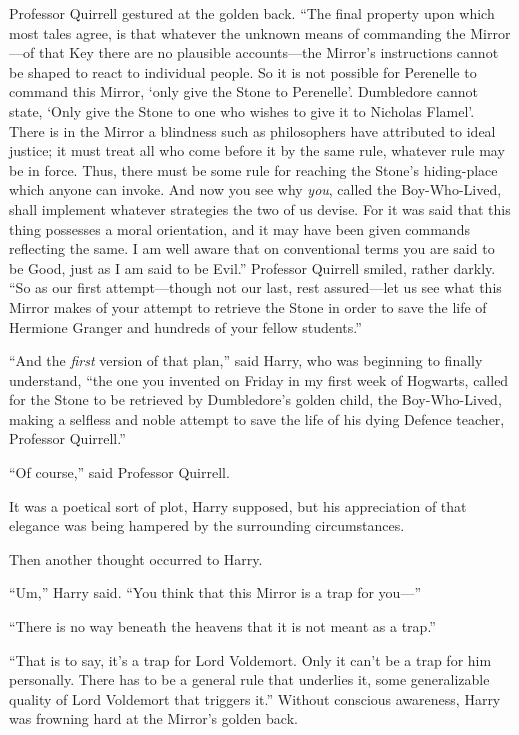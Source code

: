 Professor Quirrell gestured at the golden back. “The final property upon which
most tales agree, is that whatever the unknown means of commanding the
Mirror—of that Key there are no plausible accounts—the Mirror’s
instructions cannot be shaped to react to individual people. So it is not
possible for Perenelle to command this Mirror, ‘only give the Stone to
Perenelle’. Dumbledore cannot state, ‘Only give the Stone to one who wishes to
give it to Nicholas Flamel’. There is in the Mirror a blindness such as
philosophers have attributed to ideal justice; it must treat all who come
before it by the same rule, whatever rule may be in force. Thus, there must be
some rule for reaching the Stone’s hiding-place which anyone can invoke. And
now you see why \emph{you}, called the Boy-Who-Lived, shall implement whatever
strategies the two of us devise. For it was said that this thing possesses a
moral orientation, and it may have been given commands reflecting the same. I
am well aware that on conventional terms you are said to be Good, just as I am
said to be Evil.” Professor Quirrell smiled, rather darkly. “So as our first
attempt—though not our last, rest assured—let us see what this Mirror makes
of your attempt to retrieve the Stone in order to save the life of Hermione
Granger and hundreds of your fellow students.”

“And the \emph{first} version of that plan,” said Harry, who was beginning to
finally understand, “the one you invented on Friday in my first week of
Hogwarts, called for the Stone to be retrieved by Dumbledore’s golden child,
the Boy-Who-Lived, making a selfless and noble attempt to save the life of his
dying Defence teacher, Professor Quirrell.”

“Of course,” said Professor Quirrell.

It was a poetical sort of plot, Harry supposed, but his appreciation of that
elegance was being hampered by the surrounding circumstances.

Then another thought occurred to Harry.

“Um,” Harry said. “You think that this Mirror is a trap for you—”

“There is no way beneath the heavens that it is not meant as a trap.”

“That is to say, it’s a trap for Lord Voldemort. Only it can’t be a trap for
him personally. There has to be a general rule that underlies it, some
generalizable quality of Lord Voldemort that triggers it.” Without conscious
awareness, Harry was frowning hard at the Mirror’s golden back.

